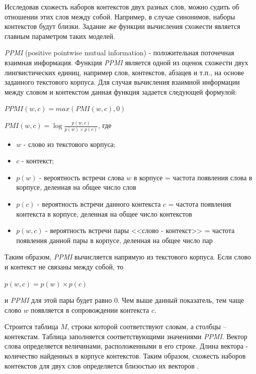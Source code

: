 Исследовав схожесть наборов контекстов двух разных слов, можно судить об отношении
этих слов между собой. Например, в случае синонимов, наборы контекстов будут близки.
Задание же функции вычисления схожести является главным параметром таких моделей.

\textit{PPMI} (positive pointwise mutual information) - положительная поточечная взаимная
информация. Функция \textit{PPMI} является одной из оценок схожести двух лингвистических
единиц, например слов, контекстов, абзацев и т.п., на основе заданного текстового
корпуса. Для случая вычисления взаимной информации между словом и контекстом
данная функция задается следующей формулой:

$PPMI (w, c) = max(PMI (w, c), 0)$

$PMI (w, c) = \log \frac{p(w, c)}{p(w) \times p(c)}$, где


\begin{itemize}
\item $w$ - слово из текстового корпуса;

\item $c$ - контекст;

\item $p(w)$ - вероятность встречи слова $w$ в корпусе = частота появления слова в
корпусе, деленная на общее число слов

\item $p(c)$ - вероятность встречи данного контекста $c$ = частота появления контекста в
корпусе, деленная на общее число контекстов

\item $p(w,c)$ - вероятность встречи пары <<слово - контекст>> = частота появления
данной пары в корпусе, деленная на общее число пар

\end{itemize}

Таким образом, \textit{PPMI} вычисляется напрямую из текстового корпуса. Если слово и
контекст не связаны между собой, то 

$p(w, c) = p(w) \times p(c)$

и \textit{PPMI} для этой пары будет равно 0. Чем выше данный показатель, тем чаще слово $w$ появляется в сопровождении
контекста $c$.

Строится таблица $M$, строки которой соответствуют словам, а столбцы – контекстам.
Таблица заполняется соответствующими значениями \textit{PPMI}. Вектор слова определяется
величинами, расположенными в его строке. Длина вектора - количество найденных в
корпусе контекстов. Таким образом, схожесть наборов контекстов для двух слов
определяется близостью их векторов \cite{PPMI}.


